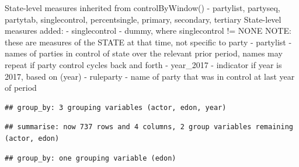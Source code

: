 \documentclass[
]{article}
\newenvironment{Shaded}{\begin{snugshade}}{\end{snugshade}}
\newcommand{\CommentTok}[1]{\textcolor[rgb]{0.56,0.35,0.01}{\textit{#1}}}
\newcommand{\DataTypeTok}[1]{\textcolor[rgb]{0.13,0.29,0.53}{#1}}
\newcommand{\DecValTok}[1]{\textcolor[rgb]{0.00,0.00,0.81}{#1}}
\newcommand{\KeywordTok}[1]{\textcolor[rgb]{0.13,0.29,0.53}{\textbf{#1}}}
\newcommand{\NormalTok}[1]{#1}
\newcommand{\OperatorTok}[1]{\textcolor[rgb]{0.81,0.36,0.00}{\textbf{#1}}}
\newcommand{\OtherTok}[1]{\textcolor[rgb]{0.56,0.35,0.01}{#1}}
\newcommand{\StringTok}[1]{\textcolor[rgb]{0.31,0.60,0.02}{#1}}
\begin{document}
State-level measures inherited from controlByWindow() - partylist,
partyseq, partytab, singlecontrol, percentsingle, primary, secondary,
tertiary State-level measures added: - singlecontrol - dummy, where
singlecontrol != NONE NOTE: these are measures of the STATE at that
time, not specific to party - partylist - names of parties in control of
state over the relevant prior period, names may repeat if party control
cycles back and forth - year\_2017 - indicator if year is 2017, based on
(year) - ruleparty - name of party that was in control at last year of
period

\begin{Shaded}
\end{Shaded}

\begin{verbatim}
## group_by: 3 grouping variables (actor, edon, year)
\end{verbatim}

\begin{verbatim}
## summarise: now 737 rows and 4 columns, 2 group variables remaining (actor, edon)
\end{verbatim}

\begin{Shaded}
\end{Shaded}

\begin{verbatim}
## group_by: one grouping variable (edon)
\end{verbatim}
\end{document}
